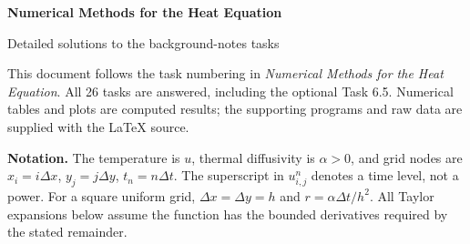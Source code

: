 \documentclass[11pt,a4paper]{article}
\begin{document}
\begin{center}
{\LARGE\bfseries Numerical Methods for the Heat Equation}\par
\vspace{5pt}
{\large Detailed solutions to the background-notes tasks}
\end{center}
\vspace{4pt}
This document follows the task numbering in \emph{Numerical Methods for the Heat Equation}.
All 26 tasks are answered, including the optional Task 6.5. Numerical tables and plots are
computed results; the supporting programs and raw data are supplied with the LaTeX source.

\textbf{Notation.} The temperature is $u$, thermal diffusivity is $\alpha>0$, and grid nodes are
$x_i=i\Delta x$, $y_j=j\Delta y$, $t_n=n\Delta t$.
The superscript in $u^n_{i,j}$ denotes a time level, not a power.
For a square uniform grid, $\Delta x=\Delta y=h$ and
$r=\alpha\Delta t/h^2$. All Taylor expansions below assume the function has the bounded
derivatives required by the stated remainder.






\end{document}
